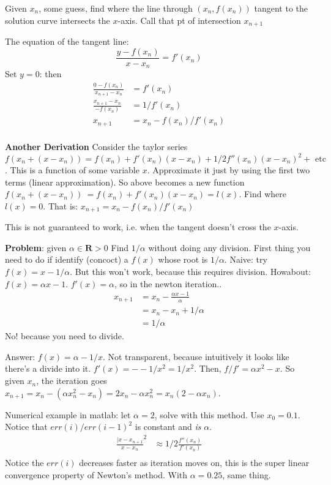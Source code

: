 Given $x_n$, some guess, find where the line through $(x_n, f(x_n))$
tangent to the solution curve intersects the $x$-axis. Call that
pt of intersection $x_{n+1}$

The equation of the tangent line: $$\frac{y-f(x_n)}{x-x_n} = f'(x_n)$$
Set $y=0$: then
\begin{align*}  \frac{0-f(x_n)}{x_{n+1}-x_n} &= f'(x_n)\\
  \frac{x_{n+1}-x_n}{-f(x_n)} &= 1/f'(x_n)\\
  x_{n+1} &= x_n - f(x_n)/f'(x_n)\\
\end{align*}

\textbf{Another Derivation}
Consider the taylor series $f(x_n+(x-x_n)) = f(x_n) + f'(x_n)(x-x_n) +
1/2f''(x_n)(x-x_n)^2 + \text{ etc}$. This is a function of some
variable $x$. Approximate it just by using the first two terms (linear
approximation).
So above becomes a new function $f(x_n+(x-x_n))~= f(x_n) +
f'(x_n)(x-x_n) = l(x)$.
Find where $l(x) = 0$. That is: $x_{n+1} = x_n - f(x_n)/f'(x_n)$

This is not guaranteed to work, i.e. when the tangent doesn't cross
the $x$-axis.


\textbf{Problem}: given $\alpha \in \mathbf{R} > 0$ Find $1/\alpha$ without
doing any division.
First thing you need to do if identify (concoct) a $f(x)$ whose root
is $1/\alpha$.
Naive: try $f(x) = x - 1/\alpha$. But this won't work, because this
requires division.
Howabout: $f(x) = \alpha x - 1$. $f'(x) = \alpha$, so in the newton
iteration.. 
\begin{align*}
x_{n+1} &= x_n - \frac{\alpha x - 1}{\alpha}\\
&= x_n - x_n + 1/\alpha \\
&= 1/\alpha
\end{align*}
No! because you need to divide.

Answer: $f(x) = \alpha - 1/x$. Not transparent, because intuitively it
looks like there's a divide into it.
$f'(x) = - -1/x^2 = 1/x^2$. Then, $f/f' = \alpha x^2 - x$. So given $x_n$,
the iteration goes $x_{n+1} = x_n - (\alpha x_n^2 - x_n) = 2x_n -
\alpha x_n^2 = x_n(2-\alpha x_n)$.

Numerical example in matlab: let $\alpha = 2$, solve with this method. Use $x_0
= 0.1$. Notice that $err(i)/err(i-1)^2$ is constant and \emph{is}
$\alpha$.
\begin{align*}
  \frac{|x-x_{n+1}}{x-x_n}^2 &\approx 1/2\frac{f''(x_n)}{f'(x_n)}\\
\end{align*}
Notice the $err(i)$ decreases faster as iteration moves on, this is
the super linear convergence property of Newton's method.
With $\alpha = 0.25$, same thing.\\

